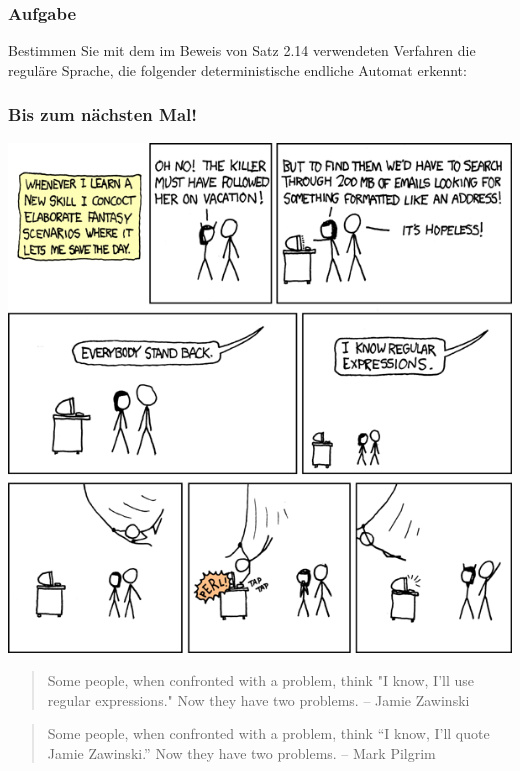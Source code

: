 \begin{frame}
\frametitle{Aufgabe}
Bestimmen Sie  mit dem im Beweis von Satz 2.14 verwendeten Verfahren die 
reguläre Sprache, die folgender deterministische endliche Automat erkennt:
\begin{figure}[H]
\begin{center}
\end{center}
\end{figure}
\end{frame}

\begin{frame}
\frametitle{Bis zum nächsten Mal!}
\begin{center}\includegraphics[height=0.6\textheight]{images/regular_expressions.png}\end{center}
\vspace{-0.5cm}

\small{\begin{quote}
Some people, when confronted with a problem, think "I know, I'll use regular expressions." Now they have two problems. -- Jamie Zawinski
\end{quote}}

\tiny{\begin{quote}
Some people, when confronted with a problem, think “I know, I’ll quote Jamie Zawinski.” Now they have two problems. -- Mark Pilgrim
\end{quote}}
\end{frame}



